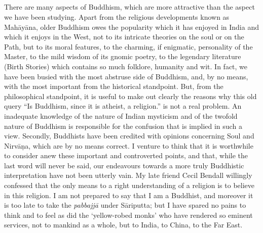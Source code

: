 \documentclass[a4paper, 11pt, oneside, english]{article}
\begin{document}
\subsection{}
\paragraph{}
There are many aspects of Buddhism, which are more attractive than the aspect we have been studying. Apart from the religious developments known as Mahāyāna, older Buddhism owes the popularity which it has enjoyed in India and which it enjoys in the West, not to its intricate theories on the soul or on the Path, but to its moral features, to the charming, if enigmatic, personality of the Master, to the mild wisdom of its gnomic poetry, to the legendary literature (Birth Stories) which contains so much folklore, humanity and wit. In fact, we have been busied with the most abstruse side of Buddhism, and, by no means, with the most important from the historical standpoint. But, from the philosophical standpoint, it is useful to make out clearly the reasons why this old query ``Is Buddhism, since it is atheist, a religion.'' is not a real problem. An inadequate knowledge of the nature of Indian mysticism and of the twofold nature of Buddhism is responsible for the confusion that is implied in such a view. Secondly, Buddhists have been credited with opinions concerning Soul and Nirvāṇa, which are by no means correct. I venture to think that it is worthwhile to consider anew these important and controverted points, and that, while the last word will never be said, our endeavours towards a more truly Buddhistic interpretation have not been utterly vain. My late friend Cecil Bendall willingly confessed that the only means to a right understanding of a religion is to believe in this religion. I am not prepared to say that I am a Buddhist, and moreover it is too late to take the \emph{pabbajjā} under Sāriputta; but I have spared no pains to think and to feel as did the `yellow-robed monks' who have rendered so eminent services, not to mankind as a whole, but to India, to China, to the Far East.
\clearpage
\end{document}
